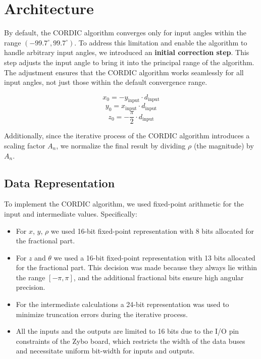 \chapter{Architecture}


By default, the CORDIC algorithm converges only for input angles within the range \( (-99.7^\circ, 99.7^\circ) \).
To address this limitation and enable the algorithm to handle arbitrary input angles, we introduced an \textbf{initial correction step}. This step adjusts the input angle to bring it into the principal range of the algorithm. The adjustment ensures that the CORDIC algorithm works seamlessly for all input angles, not just those within the default convergence range.

\[
    x_0 = -y_{\text{input}} \cdot d_{\text{input}}
\]
\[
    y_0 =  x_{\text{input}} \cdot d_{\text{input}}
\]
\[
    z_0 = -\frac{\pi}{2} \cdot d_{\text{input}}
\]

Additionally, since the iterative process of the CORDIC algorithm introduces a scaling factor \( A_n \), we normalize the final result by dividing \( \rho \) (the magnitude) by \( A_n \).

\section{Data Representation}

To implement the CORDIC algorithm, we used fixed-point arithmetic for the input and intermediate values. Specifically:

\begin{itemize}
    \item For \( x \), \( y \), \( \rho \) we used 16-bit fixed-point representation with 8 bits allocated for the fractional part.
    \item For \( z \) and \( \theta \) we used a 16-bit fixed-point representation with 13 bits allocated for the fractional part. This decision was made because they always lie within the range \( [-\pi, \pi] \), and the additional fractional bits ensure high angular precision.
    \item For the intermediate calculations a 24-bit representation was used to minimize truncation errors during the iterative process.
    \item All the inputs and the outputs are limited to 16 bits due to the I/O pin constraints of the Zybo board, which restricts the width of the data buses and necessitate uniform bit-width for inputs and outputs.
\end{itemize}

